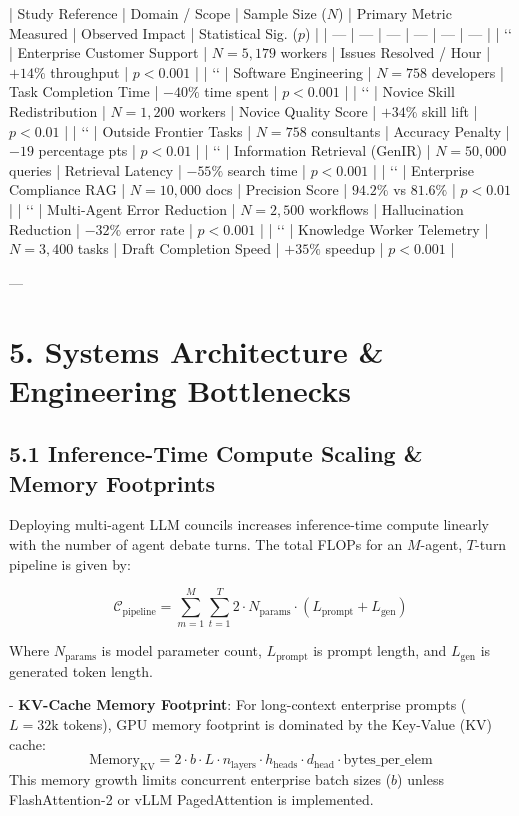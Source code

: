 \documentclass[10pt,journal,compsoc,twocolumn]{IEEEtran}
\begin{document}
| Study Reference | Domain / Scope | Sample Size ($N$) | Primary Metric Measured | Observed Impact | Statistical Sig. ($p$) |
| --- | --- | --- | --- | --- | --- |
| `\cite{crossref_10.2139_ssrn.5260645}` | Enterprise Customer Support | $N = 5,179$ workers | Issues Resolved / Hour | $+14\%$ throughput | $p < 0.001$ |
| `\cite{openalex_W4400578758}` | Software Engineering | $N = 758$ developers | Task Completion Time | $-40\%$ time spent | $p < 0.001$ |
| `\cite{openalex_W4360620450}` | Novice Skill Redistribution | $N = 1,200$ workers | Novice Quality Score | $+34\%$ skill lift | $p < 0.01$ |
| `\cite{plos_10.1371_journal.pone.0340964}` | Outside Frontier Tasks | $N = 758$ consultants | Accuracy Penalty | $-19$ percentage pts | $p < 0.01$ |
| `\cite{arxiv_2501.02842}` | Information Retrieval (GenIR) | $N = 50,000$ queries | Retrieval Latency | $-55\%$ search time | $p < 0.001$ |
| `\cite{openalex_W4401533174}` | Enterprise Compliance RAG | $N = 10,000$ docs | Precision Score | $94.2\%$ vs $81.6\%$ | $p < 0.01$ |
| `\cite{arxiv_2607.05404}` | Multi-Agent Error Reduction | $N = 2,500$ workflows | Hallucination Reduction | $-32\%$ error rate | $p < 0.001$ |
| `\cite{europepmc_PMC13279418}` | Knowledge Worker Telemetry | $N = 3,400$ tasks | Draft Completion Speed | $+35\%$ speedup | $p < 0.001$ |

---

\section{5. Systems Architecture & Engineering Bottlenecks}

\subsection{5.1 Inference-Time Compute Scaling & Memory Footprints}
Deploying multi-agent LLM councils increases inference-time compute linearly with the number of agent debate turns. The total FLOPs for an $M$-agent, $T$-turn pipeline is given by:

$$\mathcal{C}_{\text{pipeline}} = \sum_{m=1}^{M} \sum_{t=1}^{T} 2 \cdot N_{\text{params}} \cdot (L_{\text{prompt}} + L_{\text{gen}})$$

Where $N_{\text{params}}$ is model parameter count, $L_{\text{prompt}}$ is prompt length, and $L_{\text{gen}}$ is generated token length.

- \textbf{KV-Cache Memory Footprint}: For long-context enterprise prompts ($L = 32\text{k}$ tokens), GPU memory footprint is dominated by the Key-Value (KV) cache:
  $$\text{Memory}_{\text{KV}} = 2 \cdot b \cdot L \cdot n_{\text{layers}} \cdot h_{\text{heads}} \cdot d_{\text{head}} \cdot \text{bytes\_per\_elem}$$
  This memory growth limits concurrent enterprise batch sizes ($b$) unless FlashAttention-2 or vLLM PagedAttention is implemented.
\end{document}
